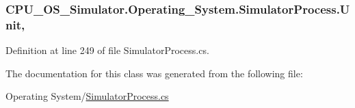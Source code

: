 \subsubsection[{Unit}]{ C\+P\+U\+\_\+\+O\+S\+\_\+\+Simulator.\+Operating\+\_\+\+System.\+Simulator\+Process.\+Unit\hspace{0.3cm}{\ttfamily [get]}, {\ttfamily [set]}}\label{class_c_p_u___o_s___simulator_1_1_operating___system_1_1_simulator_process_ab00659160e7658c9d07136a1785c6d64}


Definition at line 249 of file Simulator\+Process.\+cs.



The documentation for this class was generated from the following file\+:\begin{DoxyCompactItemize}
\item 
Operating System/\hyperlink{_simulator_process_8cs}{Simulator\+Process.\+cs}\end{DoxyCompactItemize}
